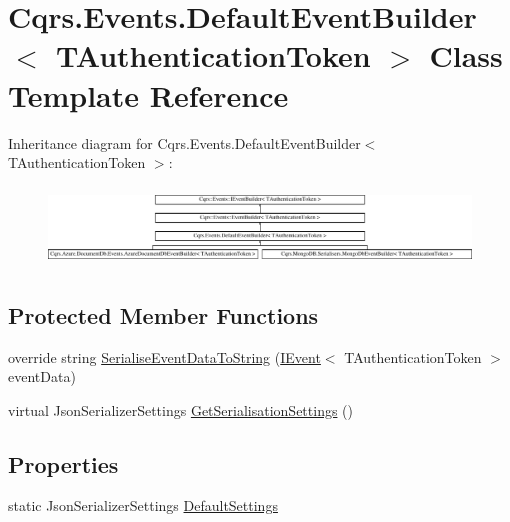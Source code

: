 \hypertarget{classCqrs_1_1Events_1_1DefaultEventBuilder}{}\section{Cqrs.\+Events.\+Default\+Event\+Builder$<$ T\+Authentication\+Token $>$ Class Template Reference}
\label{classCqrs_1_1Events_1_1DefaultEventBuilder}
Inheritance diagram for Cqrs.\+Events.\+Default\+Event\+Builder$<$ T\+Authentication\+Token $>$\+:\begin{figure}[H]
\begin{center}
\leavevmode
\includegraphics[height=2.117202cm]{classCqrs_1_1Events_1_1DefaultEventBuilder}
\end{center}
\end{figure}
\subsection*{Protected Member Functions}
\begin{DoxyCompactItemize}
\item 
override string \hyperlink{classCqrs_1_1Events_1_1DefaultEventBuilder_afb73a13003a94135e5c97436e7e78e13}{Serialise\+Event\+Data\+To\+String} (\hyperlink{interfaceCqrs_1_1Events_1_1IEvent}{I\+Event}$<$ T\+Authentication\+Token $>$ event\+Data)
\item 
virtual Json\+Serializer\+Settings \hyperlink{classCqrs_1_1Events_1_1DefaultEventBuilder_a49be2758fa32166f1b95e8c0eb9355d1}{Get\+Serialisation\+Settings} ()
\end{DoxyCompactItemize}
\subsection*{Properties}
\begin{DoxyCompactItemize}
\item 
static Json\+Serializer\+Settings \hyperlink{classCqrs_1_1Events_1_1DefaultEventBuilder_aabead59863bacfed527d85ea789ab881}{Default\+Settings}
\end{DoxyCompactItemize}
